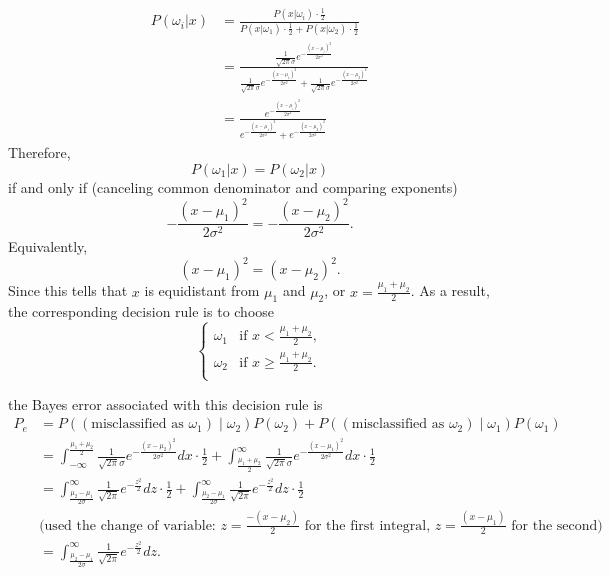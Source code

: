 \documentclass[11pt]{exam}
\theoremstyle{quest}
\begin{document}
\begin{align*}
P(\omega_i|x) &= \frac{P(x|\omega_i) \cdot \frac{1}{2}}{P(x|\omega_1) \cdot \frac{1}{2} + P(x|\omega_2) \cdot \frac{1}{2}}\\
& = \frac{\frac{1}{\sqrt{2\pi}\sigma}e^{-\frac{(x-\mu_i)^2}{2\sigma^2}}}
{\frac{1}{\sqrt{2\pi}\sigma}e^{-\frac{(x-\mu_1)^2}{2\sigma^2}}+ \frac{1}{\sqrt{2\pi}\sigma}e^{-\frac{(x-\mu_2)^2}{2\sigma^2}}}\\
&= \frac{e^{-\frac{(x-\mu_i)^2}{2\sigma^2}}}
{e^{-\frac{(x-\mu_1)^2}{2\sigma^2}}+ e^{-\frac{(x-\mu_2)^2}{2\sigma^2}}}
\end{align*}
Therefore,
\[
P(\omega_1|x) = P(\omega_2|x)
\]
if and only if (canceling common denominator and comparing exponents)
\[
 -\frac{(x-\mu_1)^2}{2\sigma^2} = -\frac{(x-\mu_2)^2}{2\sigma^2}.
\]
Equivalently,
\[
(x-\mu_1)^2 = (x-\mu_2)^2.
\]
Since this tells that $x$ is equidistant from $\mu_1$ and $\mu_2$, or $x = \frac{\mu_1 +\mu_2}{2}$. As a result, the corresponding decision rule is to choose
\[
\begin{cases}
\omega_1 &  \text{if } x < \frac{\mu_1 +\mu_2}{2},\\
\omega_2 & \text{if }  x \ge \frac{\mu_1 +\mu_2}{2}.\\
\end{cases}
\]

the Bayes error associated with this decision rule is
\begin{align*}
P_{e} &= P((\text{misclassified as }\omega_{1}) \mid \omega_{2}) P(\omega_{2}) + P((\text{misclassified as }\omega_{2}) \mid \omega_{1}) P(\omega_{1})\\
& =\int_{-\infty}^{\frac{\mu_1 +\mu_2}{2}} \frac{1}{\sqrt{2\pi}\sigma}e^{-\frac{(x-\mu_2)^2}{2\sigma^2}} dx \cdot \frac{1}{2} + \int_{\frac{\mu_1+ \mu_2}{2}}^\infty  \frac{1}{\sqrt{2\pi}\sigma}e^{-\frac{(x-\mu_1)^2}{2\sigma^2}} dx \cdot \frac{1}{2}\\
& = \int_{\frac{\mu_2-\mu_1}{2\sigma}}^{\infty}  \frac{1}{\sqrt{2\pi}} e^{-\frac{z^2}{2}} dz  \cdot \frac{1}{2}+ \int_{\frac{\mu_2-\mu_1}{2\sigma}}^{\infty} \frac{1}{\sqrt{2 \pi}} e^{-\frac{z^2}{2}} dz \cdot \frac{1}{2} \\
&\text{(used the change of variable: $z = \frac{-(x-\mu_2)}{2}$ for the first integral, $z = \frac{(x-\mu_1)}{2}$ for the second)}\\
& = \int_{\frac{\mu_2-\mu_1}{2\sigma}}^{\infty}  \frac{1}{\sqrt{2\pi}} e^{-\frac{z^2}{2}} dz .
 \end{align*}
\end{document}

